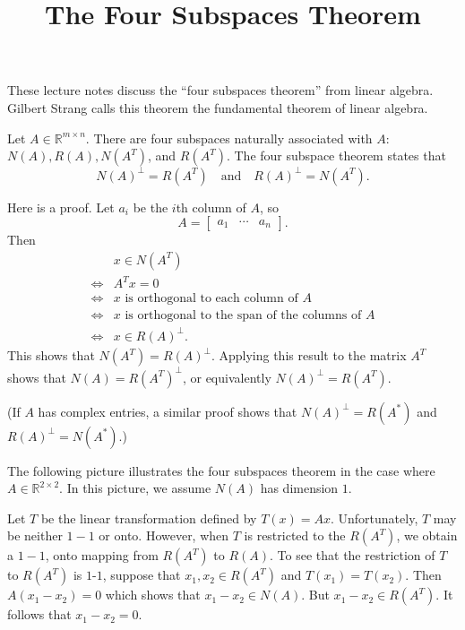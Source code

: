 \documentclass{article}
\title{The Four Subspaces Theorem}
\author{}
\date{}
\begin{document}
\maketitle

These lecture notes discuss the ``four subspaces theorem'' from linear algebra.
Gilbert Strang calls this theorem the fundamental theorem of linear algebra.

Let $A \in \mathbb R^{m \times n}$.  There are four subspaces naturally associated with $A$:
$N(A), R(A), N(A^T)$, and $R(A^T)$.  The four subspace theorem states that
\begin{equation*}
N(A)^\perp = R(A^T) \quad \text{and} \quad R(A)^\perp = N(A^T).
\end{equation*}

Here is a proof.  Let $a_i$ be the $i$th column of $A$, so
\begin{equation*}
A = \begin{bmatrix} a_1 & \cdots & a_n \end{bmatrix}.
\end{equation*}
Then
\begin{align*}
& x \in N(A^T) \\
\iff & A^T x = 0 \\
\iff & x \text{ is orthogonal to each column of } A \\
\iff & x \text{ is orthogonal to the span of the columns of } A \\
\iff & x \in R(A)^\perp.
\end{align*}
This shows that $N(A^T) = R(A)^\perp$.
Applying this result to the matrix $A^T$ shows that $N(A) = R(A^T)^\perp$,
or equivalently $N(A)^\perp = R(A^T)$.

(If $A$ has complex entries, a similar proof shows that
$N(A)^\perp = R(A^*)$ and $R(A)^\perp = N(A^*)$.)

The following picture illustrates the four subspaces theorem in the case
where $A \in \mathbb R^{2 \times 2}$.  In this picture,
we assume $N(A)$ has dimension $1$.

Let $T$ be the linear transformation defined by $T(x) = Ax$.
Unfortunately, $T$ may be neither $1-1$ or onto.
However, when $T$ is restricted to the $R(A^T)$,
we obtain a $1-1$, onto mapping from $R(A^T)$ to $R(A)$.
To see that the restriction of $T$ to $R(A^T)$ is $1$-$1$,
suppose that $x_1, x_2 \in R(A^T)$ and $T(x_1) = T(x_2)$.
Then $A(x_1 - x_2) = 0$ which shows that $x_1 - x_2 \in N(A)$.
But $x_1 - x_2 \in R(A^T)$.  It follows that $x_1 - x_2 = 0$.
\end{document}
